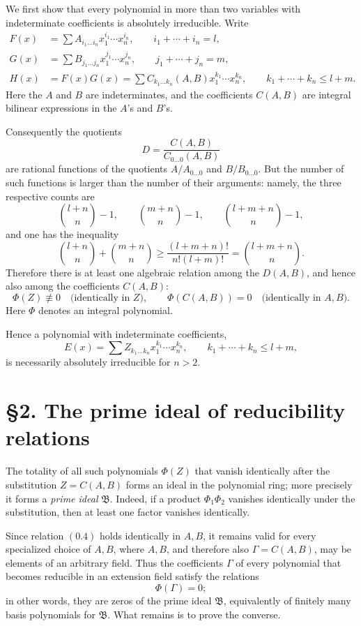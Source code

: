 \documentclass[11pt]{article}
\begin{document}
We first show that every polynomial in more than two variables with indeterminate coefficients is absolutely irreducible. Write
\begin{align}
F(x) &= \sum A_{i_1\dots i_n}x_1^{i_1}\cdots x_n^{i_n}, \qquad i_1+\cdots+i_n=l, \tag{0.1}\\
G(x) &= \sum B_{j_1\dots j_n}x_1^{j_1}\cdots x_n^{j_n}, \qquad j_1+\cdots+j_n=m, \tag{0.2}\\
H(x) &= F(x)G(x)=\sum C_{k_1\dots k_n}(A,B)x_1^{k_1}\cdots x_n^{k_n},
\qquad k_1+\cdots+k_n\le l+m. \tag{0.3}
\end{align}
Here the $A$ and $B$ are indeterminates, and the coefficients $C(A,B)$ are integral bilinear expressions in the $A$'s and $B$'s.

Consequently the quotients
\[
D = \frac{C(A,B)}{C_{0\dots 0}(A,B)}
\]
are rational functions of the quotients $A/A_{0\dots 0}$ and $B/B_{0\dots 0}$. But the number of such functions is larger than the number of their arguments: namely, the three respective counts are
\[
\binom{l+n}{n}-1,\qquad \binom{m+n}{n}-1,
\qquad \binom{l+m+n}{n}-1,
\]
and one has the inequality
\[
\binom{l+n}{n}+\binom{m+n}{n}
\ge \frac{(l+m+n)!}{n!(l+m)!}
= \binom{l+m+n}{n}.
\]
Therefore there is at least one algebraic relation among the $D(A,B)$, and hence also among the coefficients $C(A,B)$:
\[
\Phi(Z)\not\equiv 0 \quad \text{(identically in $Z$)},
\qquad \Phi(C(A,B))=0 \quad \text{(identically in $A,B$)}.
\tag{0.4}
\]
Here $\Phi$ denotes an integral polynomial.

Hence a polynomial with indeterminate coefficients,
\[
E(x)=\sum Z_{k_1\dots k_n}x_1^{k_1}\cdots x_n^{k_n},
\qquad k_1+\cdots+k_n\le l+m,
\tag{0.5}
\]
is necessarily absolutely irreducible for $n>2$.

\section*{\S 2. The prime ideal of reducibility relations}

The totality of all such polynomials $\Phi(Z)$ that vanish identically after the substitution $Z=C(A,B)$ forms an ideal in the polynomial ring; more precisely it forms a \emph{prime ideal} $\mathfrak B$. Indeed, if a product $\Phi_1\Phi_2$ vanishes identically under the substitution, then at least one factor vanishes identically.

Since relation \((0.4)\) holds identically in $A,B$, it remains valid for every specialized choice of $A,B$, where $A,B$, and therefore also $\Gamma=C(A,B)$, may be elements of an arbitrary field. Thus the coefficients $\Gamma$ of every polynomial that becomes reducible in an extension field satisfy the relations
\[
\Phi(\Gamma)=0;
\]
in other words, they are zeros of the prime ideal $\mathfrak B$, equivalently of finitely many basis polynomials for $\mathfrak B$. What remains is to prove the converse.
\end{document}
